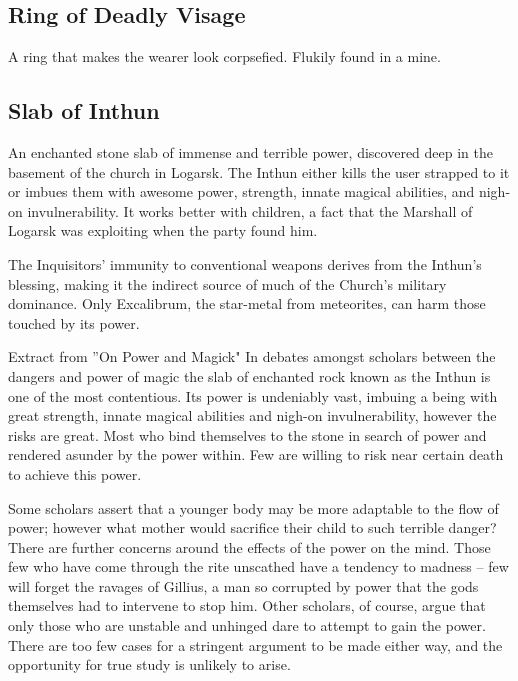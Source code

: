 \smallskip

\subsection*{Ring of Deadly Visage}

\noindent

A ring that makes the wearer look corpsefied.  Flukily found in a mine.

\smallskip

\subsection*{Slab of Inthun}

\noindent

An enchanted stone slab of immense and terrible power, discovered deep in the basement of the church in Logarsk.  The Inthun either kills the user strapped to it or imbues them with awesome power, strength, innate magical abilities, and nigh-on invulnerability.  It works better with children, a fact that the Marshall of Logarsk was exploiting when the party found him.

The Inquisitors' immunity to conventional weapons derives from the Inthun's blessing, making it the indirect source of much of the Church's military dominance.  Only Excalibrum, the star-metal from meteorites, can harm those touched by its power.

\begin{DndComment}{Extract from ''On Power and Magick"}
In debates amongst scholars between the dangers and power of magic the slab of enchanted rock known as the Inthun is one of the most contentious. Its power is undeniably vast, imbuing a being with great strength, innate magical abilities and nigh-on invulnerability, however the risks are great. Most who bind themselves to the stone in search of power and rendered asunder by the power within. Few are willing to risk near certain death to achieve this power.

Some scholars assert that a younger body may be more adaptable to the flow of power; however what mother would sacrifice their child to such terrible danger? There are further concerns around the effects of the power on the mind. Those few who have come through the rite unscathed have a tendency to madness – few will forget the ravages of Gillius, a man so corrupted by power that the gods themselves had to intervene to stop him. Other scholars, of course, argue that only those who are unstable and unhinged dare to attempt to gain the power. There are too few cases for a stringent argument to be made either way, and the opportunity for true study is unlikely to arise.
\end{DndComment}

